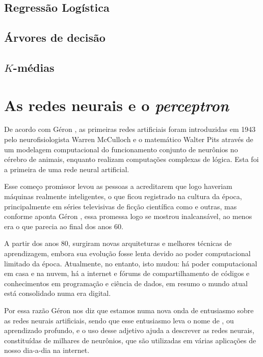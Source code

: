\subsection{Regressão Logística}



\subsection{Árvores de decisão}



\subsection{$K$-médias}



\section{As redes neurais e o \emph{perceptron}}

De acordo com Géron \citep{hands}, as primeiras redes artificiais foram introduzidas em 1943 pelo neurofisiologista Warren McCulloch e o matemático Walter Pits através de um modelagem computacional do funcionamento conjunto de neurônios no cérebro de animais, enquanto realizam computações complexas de lógica. Esta foi a primeira  de uma rede neural artificial.

Esse começo promissor levou as pessoas a acreditarem que logo haveriam máquinas realmente inteligentes, o que ficou registrado na cultura da época, principalmente em séries televisivas de ficção científica como  e outras, mas conforme aponta Géron \citep{hands}, essa promessa logo se mostrou inalcansável, ao menos era o que parecia ao final dos anos 60. 

A partir dos anos 80, surgiram novas arquiteturas e melhores técnicas de aprendizagem, embora sua evolução fosse lenta devido ao poder computacional limitado da época. Atualmente, no entanto, isto mudou: há poder computacional em casa e na nuvem, há a internet e fórums de compartilhamento de códigos e conhecimentos em programação e ciência de dados, em resumo o mundo atual está consolidado numa era digital. 

Por essa razão Géron \citep{hands} nos diz que estamos numa nova onda de entusiasmo sobre as redes neurais artificiais, sendo que esse entusiasmo leva o nome de , ou aprendizado profundo, e o uso desse adjetivo ajuda a descrever as redes neurais, constituídas de milhares de neurônios, que são utilizadas em várias aplicações de nosso dia-a-dia na internet.

